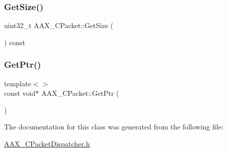 \subsubsection{\texorpdfstring{GetSize()}{GetSize()}}
{\footnotesize\ttfamily uint32\+\_\+t A\+A\+X\+\_\+\+C\+Packet\+::\+Get\+Size (\begin{DoxyParamCaption}{ }\end{DoxyParamCaption}) const\hspace{0.3cm}{\ttfamily [inline]}}

\mbox{\label{a01513_a14cb7e34d64f05dd57ff8b903602f32b}} 
\subsubsection{\texorpdfstring{GetPtr()}{GetPtr()}\hspace{0.1cm}{\footnotesize\ttfamily [2/2]}}
{\footnotesize\ttfamily template$<$$>$ \\
const void$\ast$ A\+A\+X\+\_\+\+C\+Packet\+::\+Get\+Ptr (\begin{DoxyParamCaption}{ }\end{DoxyParamCaption})\hspace{0.3cm}{\ttfamily [inline]}}



The documentation for this class was generated from the following file\+:\begin{DoxyCompactItemize}
\item 
\mbox{\hyperlink{a00452}{A\+A\+X\+\_\+\+C\+Packet\+Dispatcher.\+h}}\end{DoxyCompactItemize}
